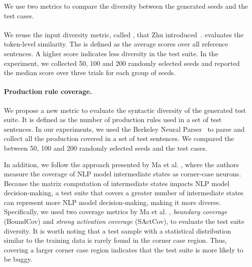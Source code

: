 We use two metrics to compare the diversity between the \tool
generated seeds and the \Cklst test cases.

\paragraph*{\selfbleu} We reuse the input diversity metric, 
called \selfbleu, that Zhu \etal
introduced~\cite{zhu2018texygen}. \bleu evaluates the token-level
similarity.
The \selfbleu is defined as the average \bleu scores over all
reference sentences.
A higher \selfbleu score indicates less diversity in the test
suite. In the experiment, we collected 50, 100 and 200 randomly
selected \tool seeds and reported the median \selfbleu score over
three trials for each group of seeds.

\paragraph*{Production rule coverage.} We propose a new metric to evaluate the syntactic diversity of the generated test suite.
It is defined as the number of production rules used in a set of test
sentences. In our experiments, we used the Berkeley Neural
Parser~\cite{kitaev2018seedparser,kitaev2019seedparser} to parse and
collect all the production covered in a set of test sentences.  We
compared the \pdr between 50, 100 and 200 randomly selected \tool
seeds and the \Cklst test cases.


In addition, we follow the approach presented by Ma et
al. \cite{ma2018deepgauge}, where the authors measure the coverage of
NLP model intermediate states as corner-case neurons.  Because the
matrix computation of intermediate states impacts NLP model
decision-making, a test suite that covers a greater number of
intermediate states can represent more NLP model decision-making,
making it more diverse.  Specifically, we used two coverage metrics by
Ma et al. \cite{ma2018deepgauge}, \textit{boundary coverage}
(BoundCov) and \textit{strong activation coverage} (SActCov), to
evaluate the test suite diversity.  It is worth noting that a test
sample with a statistical distribution similar to the training data is
rarely found in the corner case region.  Thus, covering a larger
corner case region indicates that the test suite is more likely to be
buggy.


